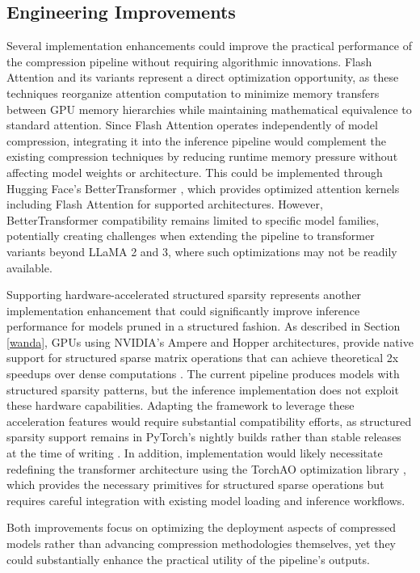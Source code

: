 \subsection{Engineering Improvements}
Several implementation enhancements could improve the practical performance of the compression pipeline without requiring algorithmic innovations. Flash Attention \cite{flash_attention} and its variants represent a direct optimization opportunity, as these techniques reorganize attention computation to minimize memory transfers between GPU memory hierarchies while maintaining mathematical equivalence to standard attention. Since Flash Attention operates independently of model compression, integrating it into the inference pipeline would complement the existing compression techniques by reducing runtime memory pressure without affecting model weights or architecture. This could be implemented through Hugging Face's BetterTransformer \cite{bettertransformer}, which provides optimized attention kernels including Flash Attention for supported architectures. However, BetterTransformer compatibility remains limited to specific model families, potentially creating challenges when extending the pipeline to transformer variants beyond LLaMA 2 and 3, where such optimizations may not be readily available.

Supporting hardware-accelerated structured sparsity represents another implementation enhancement that could significantly improve inference performance for models pruned in a structured fashion. As described in Section \ref{wanda}, GPUs using NVIDIA's Ampere and Hopper architectures, provide native support for structured sparse matrix operations that can achieve theoretical 2x speedups over dense computations \cite{nvidia-width}. The current pipeline produces models with structured sparsity patterns, but the inference implementation does not exploit these hardware capabilities. Adapting the framework to leverage these acceleration features would require substantial compatibility efforts, as structured sparsity support remains in PyTorch's nightly builds rather than stable releases at the time of writing \cite{pytorch_sparsity}. In addition, implementation would likely necessitate redefining the transformer architecture using the TorchAO optimization library \cite{torchao}, which provides the necessary primitives for structured sparse operations but requires careful integration with existing model loading and inference workflows.

Both improvements focus on optimizing the deployment aspects of compressed models rather than advancing compression methodologies themselves, yet they could substantially enhance the practical utility of the pipeline's outputs.